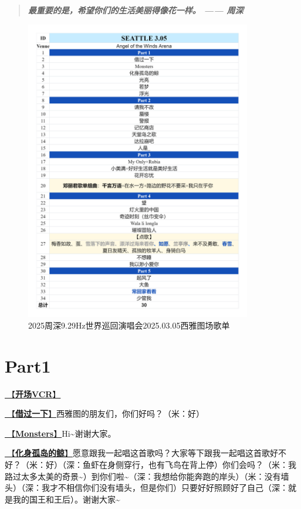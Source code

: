 \documentclass[]{ctexbook}
\begin{document}
\begin{quote}
\textbf{\emph{最重要的是，希望你们的生活美丽得像花一样。 ------ 周深}}
\end{quote}

\begin{figure}

{\centering \includegraphics[width=280pt]{img/playlists/playlists-seattle-20250305} 

}

\caption{2025周深9.29Hz世界巡回演唱会2025.03.05西雅图场歌单}\label{fig:unnamed-chunk-181}
\end{figure}

\newpage

\section{Part1}\label{Seattle-20250305-part1}

\hyperref[opening-vcr]{🎥【\textbf{开场VCR}】}

\hyperref[I-will-go-my-way]{🎵【\textbf{借过一下}】}西雅图的朋友们，你们好吗？（米：好）

\hyperref[Monsters]{🎵【\textbf{Monsters}】}Hi\textasciitilde 谢谢大家。

\hyperref[hua-shen-gu-dao-de-jing]{🎵【\textbf{化身孤岛的鲸}】}愿意跟我一起唱这首歌吗？大家等下跟我一起唱这首歌好不好？（米：好）（深：鱼虾在身侧穿行，也有飞鸟在背上停）你们会吗？（米：我路过太多太美的奇景\textasciitilde）到你们啦\textasciitilde（深：我想给你能奔跑的岸头）（米：没有墙头）（深：我才不相信你们没有墙头，但是你们）只要好好照顾好了自己（深：就是我的国王和王后）。谢谢大家\textasciitilde{}
\end{document}

